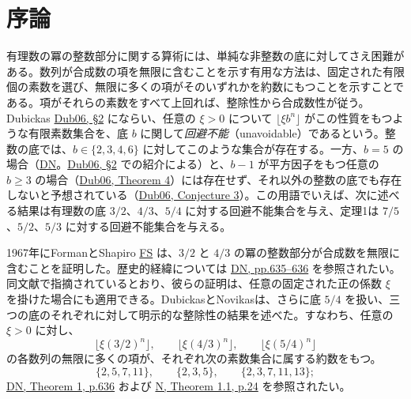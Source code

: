 \documentclass[11pt,reqno]{amsart}
\theoremstyle{definition}
\theoremstyle{definition}
\theoremstyle{remark}
\begin{document}
\section{序論}\label{sec:1}

有理数の冪の整数部分に関する算術には、単純な非整数の底に対してさえ困難がある。数列が合成数の項を無限に含むことを示す有用な方法は、固定された有限個の素数を選び、無限に多くの項がそのいずれかを約数にもつことを示すことである。項がそれらの素数をすべて上回れば、整除性から合成数性が従う。Dubickas \hyperref[ref-dub06]{Dub06, §2} にならい、任意の \(\xi>0\) について \(\lfloor\xi b^n\rfloor\) がこの性質をもつような有限素数集合を、底 \(b\) に関して\emph{回避不能}（unavoidable）であるという。整数の底では、\(b\in\{2,3,4,6\}\) に対してこのような集合が存在する。一方、\(b=5\) の場合（\hyperref[ref-dn]{DN}。\hyperref[ref-dub06]{Dub06, §2} での紹介による）と、\(b-1\) が平方因子をもつ任意の \(b\ge3\) の場合（\hyperref[ref-dub06]{Dub06, Theorem 4}）には存在せず、それ以外の整数の底でも存在しないと予想されている（\hyperref[ref-dub06]{Dub06, Conjecture 3}）。この用語でいえば、次に述べる結果は有理数の底 \(3/2\)、\(4/3\)、\(5/4\) に対する回避不能集合を与え、定理1は \(7/5\)、\(5/2\)、\(5/3\) に対する回避不能集合を与える。

1967年にFormanとShapiro \hyperref[ref-fs]{FS} は、\(3/2\) と \(4/3\) の冪の整数部分が合成数を無限に含むことを証明した。歴史的経緯については \hyperref[ref-dn]{DN, pp.635--636} を参照されたい。同文献で指摘されているとおり、彼らの証明は、任意の固定された正の係数 \(\xi\) を掛けた場合にも適用できる。DubickasとNovikasは、さらに底 \(5/4\) を扱い、三つの底のそれぞれに対して明示的な整除性の結果を述べた。すなわち、任意の \(\xi>0\) に対し、
\[
\lfloor\xi(3/2)^n\rfloor,\qquad
\lfloor\xi(4/3)^n\rfloor,\qquad
\lfloor\xi(5/4)^n\rfloor
\]
の各数列の無限に多くの項が、それぞれ次の素数集合に属する約数をもつ。
\[
\{2,5,7,11\},\qquad \{2,3,5\},\qquad \{2,3,7,11,13\};
\]
\hyperref[ref-dn]{DN, Theorem 1, p.636} および \hyperref[ref-n]{N, Theorem 1.1, p.24} を参照されたい。
\end{document}

